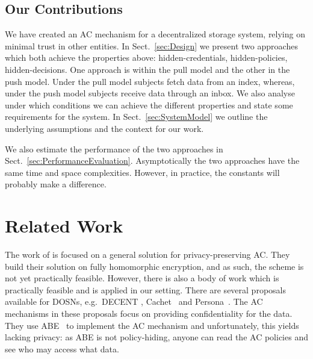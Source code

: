 \subsection{Our Contributions}

We have created an \ac{AC} mechanism for a decentralized storage system, 
relying on minimal trust in other entities.
In Sect.~\ref{sec:Design} we present two approaches which both achieve the 
properties above:
hidden-credentials,
hidden-policies,
hidden-decisions.
One approach is within the pull model and the other in the push model.
Under the pull model subjects fetch data from an index, whereas, under the push 
model subjects receive data through an inbox.
We also analyse under which conditions we can achieve the different properties 
and state some requirements for the system.
In Sect.~\ref{sec:SystemModel} we outline the underlying assumptions and the 
context for our work.

We also estimate the performance of the two approaches in 
Sect.~\ref{sec:PerformanceEvaluation}.
Asymptotically the two approaches have the same time and space complexities.
However, in practice, the constants will probably make a difference.


\section{Related Work}\label{sec:RelatedWork}

The work of \citet{TowardsPPACwHPHCHD} is focused on a general solution for 
privacy-preserving \ac{AC}.
They build their solution on fully homomorphic encryption, and as such, the 
scheme is not yet practically feasible.
However, there is also a body of work which is practically feasible and is applied in our setting.
There are several proposals available for \acp{DOSN}, e.g.~DECENT
\cite{DECENT}, Cachet~\cite{Cachet} and Persona~\cite{Persona}.
The \ac{AC} mechanisms in these proposals focus on providing confidentiality for the data. They use \ac{ABE}~\cite{abe} to implement the \ac{AC} mechanism and
unfortunately, this yields lacking privacy: as \ac{ABE} is not policy-hiding, 
anyone can read the \ac{AC} policies and see who may access what data.

